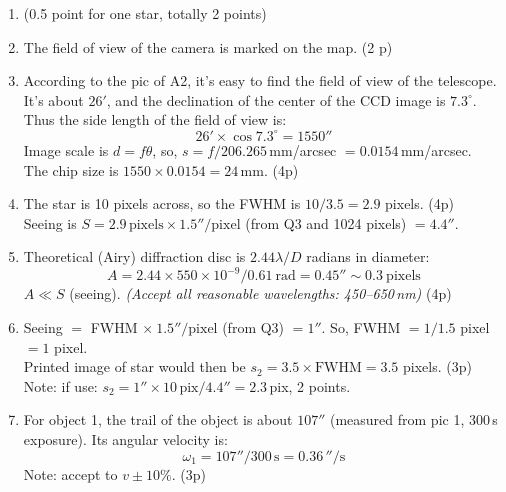 \begin{enumerate}
\item \hfill(0.5 point for one star, totally 2 points)
\item The field of view of the camera is marked on the map. \hfill(2 p)


\item According to the pic of A2, it's easy to find the field of view of the
telescope. It's about $26'$, and the declination of the center of the CCD
image is $7.3^\circ$. Thus the side length of the field of view is:
\[ 26' \times \cos 7.3^\circ = 1550'' \]
Image scale is $d = f\theta$, so, $s = f/206.265$\,mm/arcsec
$= 0.0154$\,mm/arcsec.\\
The chip size is $1550 \times 0.0154 = 24$\,mm. \hfill(4p)

\item The star is 10 pixels across, so the FWHM is $10/3.5 = 2.9$ pixels.
\hfill(4p)\\
Seeing is $S = 2.9\,\mathrm{pixels} \times 1.5''/\mathrm{pixel}$ (from Q3
and 1024 pixels) $= 4.4''$.

\item Theoretical (Airy) diffraction disc is $2.44\lambda/D$ radians in
diameter:
\[ A = 2.44 \times 550 \times 10^{-9}/0.61\ \mathrm{rad} = 0.45'' \sim 0.3\ \text{pixels} \]
$A \ll S$ (seeing). \emph{(Accept all reasonable wavelengths:
450--650\,nm)} \hfill(4p)

\item Seeing $=$ FWHM $\times\ 1.5''/\mathrm{pixel}$ (from Q3) $= 1''$. So,
FWHM $= 1/1.5$ pixel $= 1$ pixel.\\
Printed image of star would then be
$s_2 = 3.5 \times \mathrm{FWHM} = 3.5$ pixels. \hfill(3p)\\
Note: if use: $s_2 = 1'' \times 10\,\mathrm{pix}/4.4'' = 2.3$\,pix, 2 points.

\item For object 1, the trail of the object is about $107''$ (measured from
pic 1, 300\,s exposure). Its angular velocity is:
\[ \omega_1 = 107''/300\,\mathrm{s} = 0.36\,''/\mathrm{s} \]
Note: accept to $v \pm 10\%$. \hfill(3p)


\end{enumerate}
